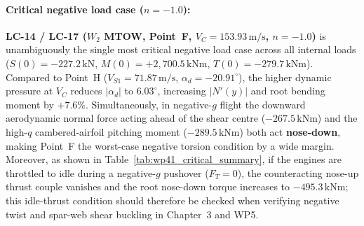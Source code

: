 \paragraph{Critical negative load case ($n = -1.0$):}
\textbf{LC-14 / LC-17 ($W_2$ MTOW, Point~F, $V_C = 153.93\,\text{m/s}$, $n = -1.0$)} is unambiguously the single most critical negative load case across all internal loads ($S(0) = -227.2\,\text{kN}$, $M(0) = +2{,}700.5\,\text{kNm}$, $T(0) = -279.7\,\text{kNm}$). Compared to Point~H ($V_{S1} = 71.87\,\text{m/s}$, $\alpha_d = -20.91^\circ$), the higher dynamic pressure at $V_C$ reduces $|\alpha_d|$ to $6.03^\circ$, increasing $|N'(y)|$ and root bending moment by $+7.6\%$. Simultaneously, in negative-$g$ flight the downward aerodynamic normal force acting ahead of the shear centre ($-267.5\,\text{kNm}$) and the high-$q$ cambered-airfoil pitching moment ($-289.5\,\text{kNm}$) both act \textbf{nose-down}, making Point~F the worst-case negative torsion condition by a wide margin. Moreover, as shown in Table~\ref{tab:wp41_critical_summary}, if the engines are throttled to idle during a negative-$g$ pushover ($F_T = 0$), the counteracting nose-up thrust couple vanishes and the root nose-down torque increases to $-495.3\,\text{kNm}$; this idle-thrust condition should therefore be checked when verifying negative twist and spar-web shear buckling in Chapter~3 and WP5.

